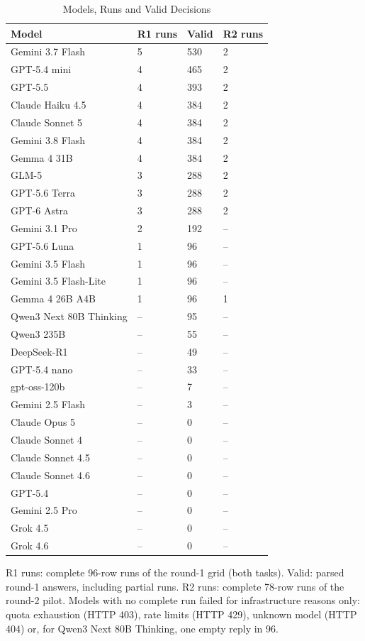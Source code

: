 \documentclass[conference]{IEEEtran}
\begin{document}
\begin{table}[t]
\caption{Models, Runs and Valid Decisions}
\label{tab:models}
\centering\footnotesize
\begin{tabular}{p{}p{}p{}p{}}
\toprule
\textbf{Model} & \textbf{R1 runs} & \textbf{Valid} & \textbf{R2 runs} \\
\midrule
Gemini 3.7 Flash & 5 & 530 & 2 \\
GPT-5.4 mini & 4 & 465 & 2 \\
GPT-5.5 & 4 & 393 & 2 \\
Claude Haiku 4.5 & 4 & 384 & 2 \\
Claude Sonnet 5 & 4 & 384 & 2 \\
Gemini 3.8 Flash & 4 & 384 & 2 \\
Gemma 4 31B & 4 & 384 & 2 \\
GLM-5 & 3 & 288 & 2 \\
GPT-5.6 Terra & 3 & 288 & 2 \\
GPT-6 Astra & 3 & 288 & 2 \\
Gemini 3.1 Pro & 2 & 192 & -- \\
GPT-5.6 Luna & 1 & 96 & -- \\
Gemini 3.5 Flash & 1 & 96 & -- \\
Gemini 3.5 Flash-Lite & 1 & 96 & -- \\
Gemma 4 26B A4B & 1 & 96 & 1 \\
Qwen3 Next 80B Thinking & -- & 95 & -- \\
Qwen3 235B & -- & 55 & -- \\
DeepSeek-R1 & -- & 49 & -- \\
GPT-5.4 nano & -- & 33 & -- \\
gpt-oss-120b & -- & 7 & -- \\
Gemini 2.5 Flash & -- & 3 & -- \\
Claude Opus 5 & -- & 0 & -- \\
Claude Sonnet 4 & -- & 0 & -- \\
Claude Sonnet 4.5 & -- & 0 & -- \\
Claude Sonnet 4.6 & -- & 0 & -- \\
GPT-5.4 & -- & 0 & -- \\
Gemini 2.5 Pro & -- & 0 & -- \\
Grok 4.5 & -- & 0 & -- \\
Grok 4.6 & -- & 0 & -- \\
\bottomrule
\end{tabular}
\par\vspace{2pt}\parbox{\columnwidth}{\scriptsize R1 runs: complete 96-row runs of the round-1 grid (both tasks). Valid: parsed round-1 answers, including partial runs. R2 runs: complete 78-row runs of the round-2 pilot. Models with no complete run failed for infrastructure reasons only: quota exhaustion (HTTP 403), rate limits (HTTP 429), unknown model (HTTP 404) or, for Qwen3 Next 80B Thinking, one empty reply in 96.}
\end{table}
\end{document}
